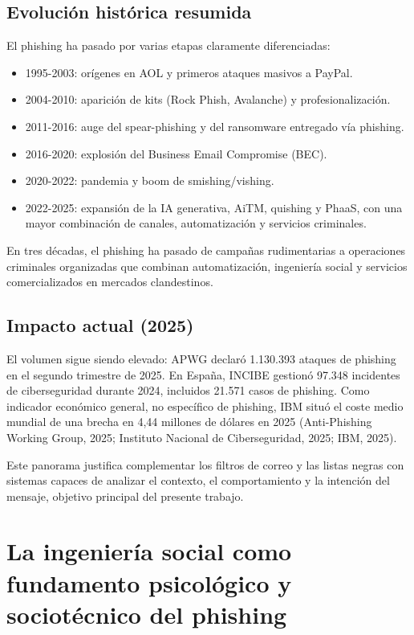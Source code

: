 \documentclass[11pt,a4paper,oneside]{report}
\begin{document}
\subsection{Evolución histórica resumida}

El phishing ha pasado por varias etapas claramente diferenciadas:

\begin{itemize}
  \item 1995-2003: orígenes en AOL y primeros ataques masivos a PayPal.
  \item 2004-2010: aparición de kits (Rock Phish, Avalanche) y profesionalización.
  \item 2011-2016: auge del spear-phishing y del ransomware entregado vía phishing.
  \item 2016-2020: explosión del Business Email Compromise (BEC).
  \item 2020-2022: pandemia y boom de smishing/vishing.
  \item 2022-2025: expansión de la IA generativa, AiTM, quishing y PhaaS, con una mayor combinación de canales, automatización y servicios criminales.
\end{itemize}

En tres décadas, el phishing ha pasado de campañas rudimentarias a operaciones criminales organizadas que combinan automatización, ingeniería social y servicios comercializados en mercados clandestinos.

\subsection{Impacto actual (2025)}

El volumen sigue siendo elevado: APWG declaró 1.130.393 ataques de phishing en el segundo trimestre de 2025. En España, INCIBE gestionó 97.348 incidentes de ciberseguridad durante 2024, incluidos 21.571 casos de phishing. Como indicador económico general, no específico de phishing, IBM situó el coste medio mundial de una brecha en 4,44 millones de dólares en 2025 (Anti-Phishing Working Group, 2025; Instituto Nacional de Ciberseguridad, 2025; IBM, 2025).

Este panorama justifica complementar los filtros de correo y las listas negras con sistemas capaces de analizar el contexto, el comportamiento y la intención del mensaje, objetivo principal del presente trabajo.

\section{La ingeniería social como fundamento psicológico y sociotécnico del phishing}
\end{document}
